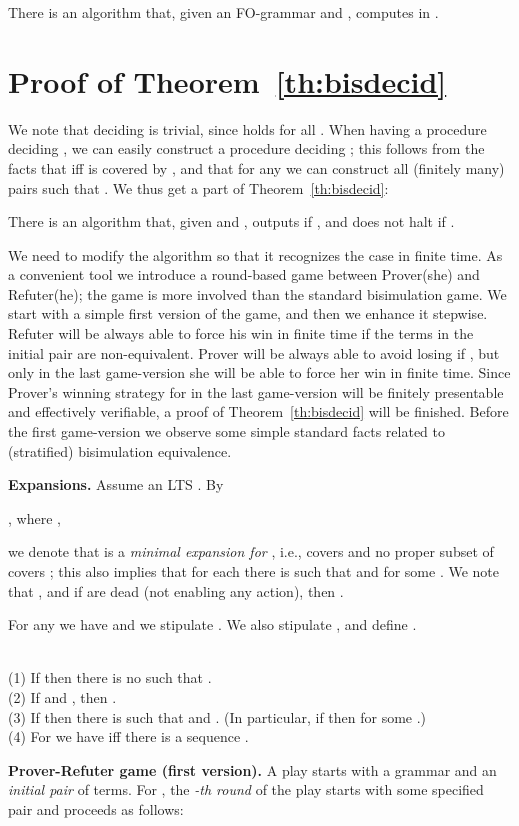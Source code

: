 \documentclass{llncs}
\begin{document}
\begin{theorem}\label{th:bisdecid}
There is an algorithm that, given an FO-grammar
 and
,
computes  in  .
\end{theorem}	


\section{Proof of Theorem~\ref{th:bisdecid}}

We note that deciding  is trivial, since 
 holds for all .  
When having a procedure deciding , we can 
easily construct a procedure deciding ;
this follows from the facts that 
 iff  is covered by
, and that
for any  we can
construct all (finitely many) pairs  such that .
We thus get a part of 
Theorem~\ref{th:bisdecid}:

\begin{proposition}\label{prop:negatcase}
There is an algorithm that, given  and ,
outputs  if , and does not halt if
.
\end{proposition}
We need to modify the algorithm so that it recognizes the case 
 in
finite time.
As a convenient  tool
we introduce a round-based game between
Prover(she) and Refuter(he); 
the game is more involved than the standard
bisimulation game. 
We start with a simple first version of the game, and then we
 enhance it stepwise.
Refuter will be always able to force his win in finite time 
if the terms in the initial pair  are non-equivalent.
Prover will be always able to avoid losing if ,
but only in the
last game-version she will be able to force her win in finite
time. Since Prover's winning strategy for 
in the last game-version
will be finitely presentable and
effectively verifiable, a proof of  Theorem~\ref{th:bisdecid} will be
finished.
Before the first game-version we 
observe some simple standard facts related to
(stratified) bisimulation equivalence.


\textbf{Expansions.}
Assume an LTS .
By
\begin{center}
, where ,
\end{center}
we denote that  is a \emph{minimal expansion for },
i.e.,  
covers 
 and no proper subset of  covers ;
this also implies
that for each  there is 
such that  and  for some .
We note that , and
if  are dead (not enabling any action), then
.

For any  we have
 and we stipulate  .
We also 
stipulate , and define
.

\begin{proposition}\label{prop:simplecovering}\hfill\\
(1) If   then there is no  
such that  .
\\
(2) If  and  , then 
.
\\
(3) If  then there is  such that 
 and . 
(In particular, if  then  for
some .)
\\
(4) For  we have  iff there is a sequence
.
\end{proposition}
\textbf{Prover-Refuter game (first version).}
A play starts with a grammar
 and an \emph{initial pair}
 of terms.
For , the \emph{-th round} of the play
starts with some specified pair  and proceeds
as follows:
\end{document}
